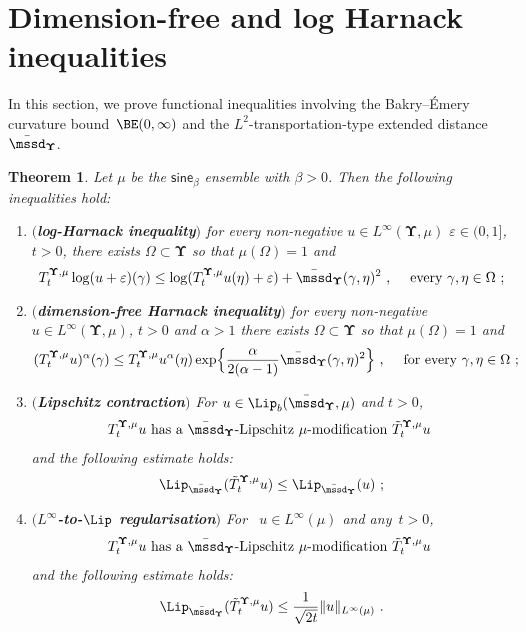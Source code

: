 \documentclass[11pt,letterpaper]{amsart}
\newcommand{\comma}{\,\,\mathrm{,}\;\,}
\newcommand{\fstop}{\,\,\mathrm{.}}
\newcommand{\cdc}{\Gamma}
\newcommand{\purple}[1]{{\color{purple}#1}}
\newcommand{\QP}{{\mu}}
\newcommand{\e}{\varepsilon}
\newcommand{\dUpsilon}{{\mathbf \Upsilon}}
\newcommand{\U}{\dUpsilon}
\newcommand{\sine}{\mathsf{sine}}
\renewcommand{\1}{\mathbf 1}
\numberwithin{equation}{section}
\theoremstyle{plain}
\newtheorem{thm}{Theorem}[section]
\theoremstyle{definition}
\theoremstyle{remark}
\begin{document}
\section{Dimension-free and log Harnack inequalities} \label{sec:LH}
In this section, we prove functional inequalities involving the Bakry--\'Emery curvature bound~$\BE(0,\infty)$ and the $L^2$-transportation-type extended distance~$\bar{\mssd}_\U$.
\begin{thm}\label{t:DFH}
Let $\QP$ be the $\sine_\beta$ ensemble with $\beta>0$. Then the following inequalities hold:
\begin{enumerate}[{\rm (a)}]
\item $(${\bf  log-Harnack inequality}$)$ for every non-negative $u \in L^\infty(\U, \QP)$ $\e \in (0,1]$, $t>0$, there exists $\Omega \subset \U$ so that $\QP(\Omega)=1$ and 
$$T^{\U, \QP}_t\log (u+\e)(\gamma) \le \log (T^{\U, \QP}_tu(\eta)+\e) + \bar{\mssd}_\U(\gamma, \eta)^2\comma \quad \text{every $\gamma, \eta \in \Omega$} \ ;$$
\item $(${\bf  dimension-free Harnack inequality}$)$ for every non-negative $u \in L^\infty(\U, \QP)$, $t>0$ and $\alpha>1$ there exists $\Omega \subset \U$ so that $\QP(\Omega)=1$ and 
$$(T^{\U, \QP}_tu)^\alpha(\gamma)\le T^{\U, \QP}_tu^\alpha(\eta) \exp\Bigl\{ \frac{\alpha}{2(\alpha-1)}\bar{\mssd}_\U(\gamma, \eta)^2\Bigr\} \comma \quad \text{for every $\gamma, \eta \in \Omega$} \ ;$$
\item $(${\bf  Lipschitz contraction}$)$ For $u \in \Lip_b(\bar{\mssd}_\U,  \QP)$ and $t>0$, 
\begin{align*}
\text{$T_t^{\U, \QP}u$ has a $\bar{\mssd}_\U$-Lipschitz $\QP$-modification~$\tilde{T}_t^{\U, \QP}u$ }
\end{align*}
and the following estimate holds:
$$\Lip_{\bar{\mssd}_\U}(\tilde{T}_t^{\U, \QP} u) \le \Lip_{\bar{\mssd}_\U}(u) \ ;$$
\item $(${\bf $L^\infty$-to-$\Lip$ regularisation}$)$ For ~$u \in L^\infty(\QP)$ and any~$t>0$, 
\begin{align*}
\text{$T_t^{\U, \QP}u$ has a $\bar{\mssd}_\U$-Lipschitz $\QP$-modification~$\tilde{T}_t^{\U, \QP}u$ }
\end{align*}
and the following estimate holds:
\begin{align*}%
\Lip_{\bar{\mssd}_\U}(\tilde{T}_t^{\U, \QP} u) \le \frac{1}{\sqrt{2 t}} \|u\|_{L^\infty(\QP)}  \fstop
\end{align*}
\end{enumerate}
\end{thm}
\end{document}
